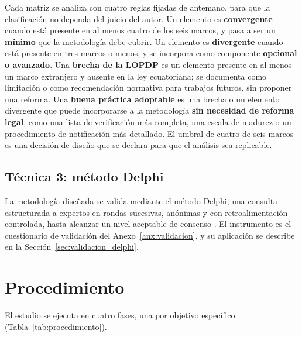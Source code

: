 Cada matriz se analiza con cuatro reglas fijadas de antemano, para que la clasificación no dependa del juicio del autor. Un elemento es \textbf{convergente} cuando está presente en al menos cuatro de los seis marcos, y pasa a ser un \textbf{mínimo} que la metodología debe cubrir. Un elemento es \textbf{divergente} cuando está presente en tres marcos o menos, y se incorpora como componente \textbf{opcional o avanzado}. Una \textbf{brecha de la LOPDP} es un elemento presente en al menos un marco extranjero y ausente en la ley ecuatoriana; se documenta como limitación o como recomendación normativa para trabajos futuros, sin proponer una reforma. Una \textbf{buena práctica adoptable} es una brecha o un elemento divergente que puede incorporarse a la metodología \textbf{sin necesidad de reforma legal}, como una lista de verificación más completa, una escala de madurez o un procedimiento de notificación más detallado. El umbral de cuatro de seis marcos es una decisión de diseño que se declara para que el análisis sea replicable.

\subsection{Técnica 3: método Delphi}

La metodología diseñada se valida mediante el método Delphi, una consulta estructurada a expertos en rondas sucesivas, anónimas y con retroalimentación controlada, hasta alcanzar un nivel aceptable de consenso \cite{okoli2004delphi}. El instrumento es el cuestionario de validación del Anexo~\ref{anx:validacion}, y su aplicación se describe en la Sección~\ref{sec:validacion_delphi}.

\section{Procedimiento}
\label{sec:procedimiento}

El estudio se ejecuta en cuatro fases, una por objetivo específico (Tabla~\ref{tab:procedimiento}).

